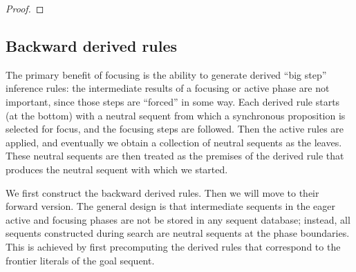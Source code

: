 \begin{proof}
\end{proof}

\subsection{Backward derived rules}

The primary benefit of focusing is the ability to generate derived ``big step''
inference rules: the intermediate results of a focusing or active phase are not
important, since those steps are ``forced'' in some way. Each derived rule
starts (at the bottom) with a neutral sequent from which a synchronous
proposition is selected for focus, and the focusing steps are followed. Then the
active rules are applied, and eventually we obtain a collection of neutral
sequents as the leaves. These neutral sequents are then treated as the premises
of the derived rule that produces the neutral sequent with which we started.

We first construct the backward derived rules. Then we will move to their
forward version. The general design is that intermediate sequents in the eager
active and focusing phases are not be stored in any sequent database; instead,
all sequents constructed during search are neutral sequents at the phase
boundaries. This is achieved by first precomputing the derived rules that
correspond to the frontier literals of the goal sequent.

